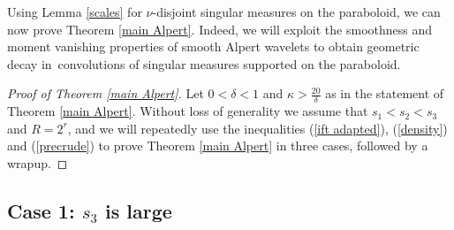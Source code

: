 \documentclass{amsart}%
\theoremstyle{plain}
\numberwithin{equation}{section}
\begin{document}
Using Lemma \ref{scales} for $\nu$-disjoint singular measures on the
paraboloid, we can now prove Theorem \ref{main Alpert}. Indeed, we will
exploit the smoothness and moment vanishing properties of smooth Alpert
wavelets to obtain geometric decay in\ convolutions of singular measures
supported on the paraboloid.

\begin{proof}
[Proof of Theorem \ref{main Alpert}]Let $0<\delta<1$ and $\kappa>\frac
{20}{\delta}$ as in the statement of Theorem \ref{main Alpert}. Without loss
of generality we assume that $s_{1}<s_{2}<s_{3}$ and $R=2^{r}$, and we will
repeatedly use the inequalities (\ref{ift adapted}), (\ref{density}) and
(\ref{precrude}) to prove Theorem \ref{main Alpert} in three cases, followed
by a wrapup.
\end{proof}

\subsection{Case 1: $s_{3}$ is large}
\end{document}
